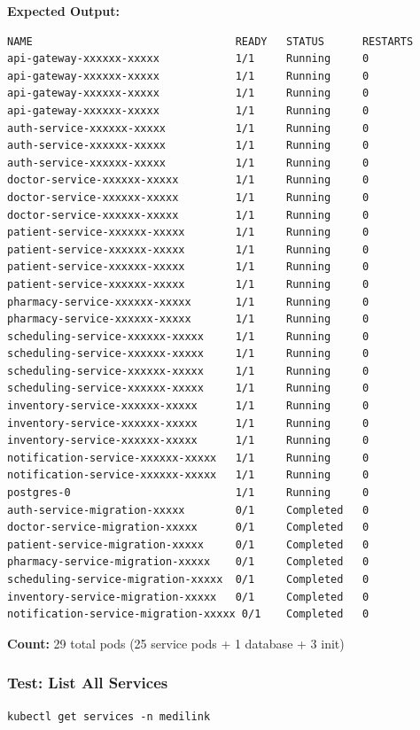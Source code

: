 \documentclass[12pt,a4paper]{article}
\begin{document}
\textbf{Expected Output:}
\begin{lstlisting}[style=bash]
NAME                                READY   STATUS      RESTARTS
api-gateway-xxxxxx-xxxxx            1/1     Running     0
api-gateway-xxxxxx-xxxxx            1/1     Running     0
api-gateway-xxxxxx-xxxxx            1/1     Running     0
api-gateway-xxxxxx-xxxxx            1/1     Running     0
auth-service-xxxxxx-xxxxx           1/1     Running     0
auth-service-xxxxxx-xxxxx           1/1     Running     0
auth-service-xxxxxx-xxxxx           1/1     Running     0
doctor-service-xxxxxx-xxxxx         1/1     Running     0
doctor-service-xxxxxx-xxxxx         1/1     Running     0
doctor-service-xxxxxx-xxxxx         1/1     Running     0
patient-service-xxxxxx-xxxxx        1/1     Running     0
patient-service-xxxxxx-xxxxx        1/1     Running     0
patient-service-xxxxxx-xxxxx        1/1     Running     0
patient-service-xxxxxx-xxxxx        1/1     Running     0
pharmacy-service-xxxxxx-xxxxx       1/1     Running     0
pharmacy-service-xxxxxx-xxxxx       1/1     Running     0
scheduling-service-xxxxxx-xxxxx     1/1     Running     0
scheduling-service-xxxxxx-xxxxx     1/1     Running     0
scheduling-service-xxxxxx-xxxxx     1/1     Running     0
scheduling-service-xxxxxx-xxxxx     1/1     Running     0
inventory-service-xxxxxx-xxxxx      1/1     Running     0
inventory-service-xxxxxx-xxxxx      1/1     Running     0
inventory-service-xxxxxx-xxxxx      1/1     Running     0
notification-service-xxxxxx-xxxxx   1/1     Running     0
notification-service-xxxxxx-xxxxx   1/1     Running     0
postgres-0                          1/1     Running     0
auth-service-migration-xxxxx        0/1     Completed   0
doctor-service-migration-xxxxx      0/1     Completed   0
patient-service-migration-xxxxx     0/1     Completed   0
pharmacy-service-migration-xxxxx    0/1     Completed   0
scheduling-service-migration-xxxxx  0/1     Completed   0
inventory-service-migration-xxxxx   0/1     Completed   0
notification-service-migration-xxxxx 0/1    Completed   0
\end{lstlisting}

\textbf{Count:} 29 total pods (25 service pods + 1 database + 3 init)

\subsubsection{Test: List All Services}
\begin{lstlisting}[style=bash]
kubectl get services -n medilink
\end{lstlisting}
\end{document}
